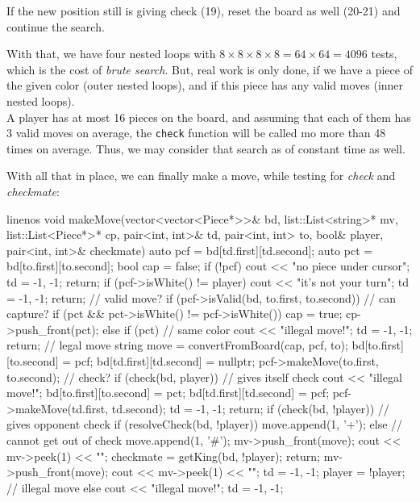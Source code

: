 If the new position still is giving check (19), reset the board as well (20-21) and continue the search.

With that, we have four nested loops with $8 \times 8 \times 8 \times 8 = 64 \times 64 = 4096$ tests,
which is the cost of \emph{brute search}.
But, real work is only done, if we have a piece of the given color (outer nested loops), and if
this piece has any valid moves (inner nested loops).\\
A player has at most 16 pieces on the board, and assuming that each of them has 3 valid moves
on average, the \texttt{check} function will be called mo more than 48 times on average.
Thus, we may consider that search as of constant time as well.

With all that in place, we can finally make a move, while testing for \emph{check} and \emph{checkmate}:

\begin{cpp*}{linenos}
void makeMove(vector<vector<Piece*>>& bd,
              list::List<string>* mv,
              list::List<Piece*>* cp,
              pair<int, int>& td,
              pair<int, int> to,
              bool& player,
              pair<int, int>& checkmate)
{
  auto pcf = bd[td.first][td.second];
  auto pct = bd[to.first][to.second];
  bool cap = false;
  if (!pcf) {
    cout << "no piece under cursor\n";
    td = {-1, -1};
    return;
  }
  if (pcf->isWhite() != player) {
    cout << "it's not your turn\n";
    td = {-1, -1};
    return;
  }
  // valid move?
  if (pcf->isValid(bd, to.first, to.second)) {
    // can capture?
    if (pct && pct->isWhite() != pcf->isWhite()) {
      cap = true;
      cp->push_front(pct);
    } else if (pct) { // same color
      cout << "illegal move!\n";
      td = {-1, -1};
      return;
    }
    // legal move
    string move = convertFromBoard(cap, pcf, to);
    bd[to.first][to.second] = pcf;
    bd[td.first][td.second] = nullptr;
    pcf->makeMove(to.first, to.second);
    // check?
    if (check(bd, player)) { // gives itself check
      cout << "illegal move!\n";
      bd[to.first][to.second] = pct;
      bd[td.first][td.second] = pcf;
      pcf->makeMove(td.first, td.second);
      td = {-1, -1};
      return;
    }
    if (check(bd, !player)) { // gives opponent check
      if (resolveCheck(bd, !player)) {
        move.append(1, '+');
      } else { // cannot get out of check
        move.append(1, '#');
        mv->push_front(move);
        cout << mv->peek(1) << "\n";
        checkmate = getKing(bd, !player);
        return;
      }
    }
    mv->push_front(move);
    cout << mv->peek(1) << "\n";
    td = {-1, -1};
    player = !player;
  // illegal move
  } else {
    cout << "illegal move!\n";
    td = {-1, -1};
  }
}
\end{cpp*}


